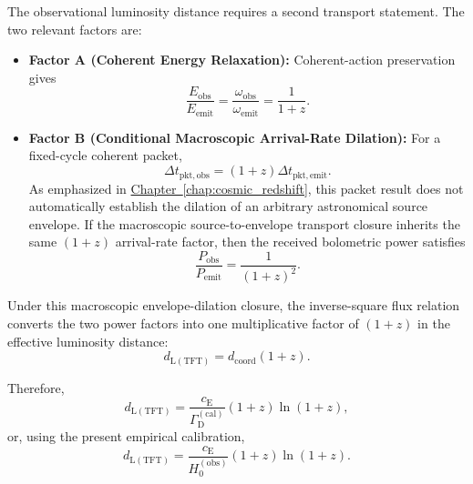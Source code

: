 The observational luminosity distance requires a second transport statement. The two relevant factors are:

\begin{itemize}
    \item \textbf{Factor A (Coherent Energy Relaxation):} Coherent-action preservation gives
    \begin{equation}
        \frac{E_{\mathrm{obs}}}{E_{\mathrm{emit}}}
        =
        \frac{\omega_{\mathrm{obs}}}{\omega_{\mathrm{emit}}}
        =
        \frac{1}{1+z}.
    \end{equation}

    \item \textbf{Factor B (Conditional Macroscopic Arrival-Rate Dilation):} For a fixed-cycle coherent packet,
    \begin{equation}
        \Delta t_{\mathrm{pkt,obs}}
        =
        (1+z)\Delta t_{\mathrm{pkt,emit}}.
    \end{equation}
    As emphasized in \hyperref[chap:cosmic_redshift]{Chapter~\ref*{chap:cosmic_redshift}}, this packet result does not automatically establish the dilation of an arbitrary astronomical source envelope. If the macroscopic source-to-envelope transport closure inherits the same $(1+z)$ arrival-rate factor, then the received bolometric power satisfies
    \begin{equation}
        \frac{P_{\mathrm{obs}}}{P_{\mathrm{emit}}}
        =
        \frac{1}{(1+z)^2}.
    \end{equation}
\end{itemize}

Under this macroscopic envelope-dilation closure, the inverse-square flux relation converts the two power factors into one multiplicative factor of $(1+z)$ in the effective luminosity distance:
\begin{equation}
    d_{\mathrm{L(TFT)}}
    =
    d_{\mathrm{coord}}(1+z).
\end{equation}

Therefore,
\begin{equation}
    d_{\mathrm{L(TFT)}}
    =
    \frac{c_{\mathrm{E}}}
    {\Gamma_{\mathrm{D}}^{(\mathrm{cal})}}
    (1+z)\ln(1+z),
\end{equation}
or, using the present empirical calibration,
\begin{equation}
    d_{\mathrm{L(TFT)}}
    =
    \frac{c_{\mathrm{E}}}
    {H_0^{(\mathrm{obs})}}
    (1+z)\ln(1+z).
\end{equation}

